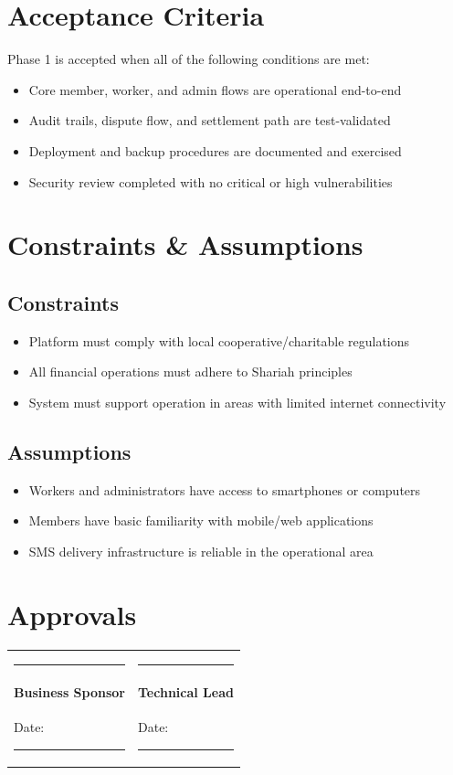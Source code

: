 \documentclass[11pt,a4paper]{article}
\begin{document}
\section{Acceptance Criteria}

Phase 1 is accepted when all of the following conditions are met:

\begin{itemize}
    \item Core member, worker, and admin flows are operational end-to-end
    \item Audit trails, dispute flow, and settlement path are test-validated
    \item Deployment and backup procedures are documented and exercised
    \item Security review completed with no critical or high vulnerabilities
\end{itemize}

\section{Constraints \& Assumptions}

\subsection{Constraints}
\begin{itemize}
    \item Platform must comply with local cooperative/charitable regulations
    \item All financial operations must adhere to Shariah principles
    \item System must support operation in areas with limited internet connectivity
\end{itemize}

\subsection{Assumptions}
\begin{itemize}
    \item Workers and administrators have access to smartphones or computers
    \item Members have basic familiarity with mobile/web applications
    \item SMS delivery infrastructure is reliable in the operational area
\end{itemize}

\section{Approvals}

\vspace{1cm}

\begin{tabular}{@{}p{6cm}p{6cm}@{}}
\rule{5cm}{0.4pt} & \rule{5cm}{0.4pt} \\
\textbf{Business Sponsor} & \textbf{Technical Lead} \\
Date: \rule{3cm}{0.4pt} & Date: \rule{3cm}{0.4pt} \\
\end{tabular}
\end{document}
